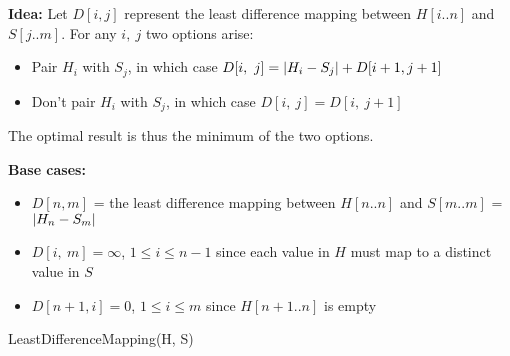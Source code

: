\documentclass[12pt]{article}
\newenvironment{question}[2][Question]{\begin{trivlist}
\item[\hskip \labelsep {\bfseries #1}\hskip \labelsep {\bfseries #2.}]}{\end{trivlist}}
\DeclarePairedDelimiter\abs{\lvert}{\rvert}%
\begin{document}
\begin{question}{2 (a)}
\end{question}

\begin{question}{2 (b)}
  \leavevmode \\ \\
  \textbf{Idea:} Let $D[i, j]$ represent the least difference mapping between
  $H[i..n]$ and $S[j..m]$.  For any $i,\ j$ two options arise:
  \begin{itemize}
    \item Pair $H_{i}$ with $S_{j}$, in which case $D[i,\ j] = \abs{H_{i} - S_{j}} + D[i + 1, j + 1]$
    \item Don't pair $H_{i}$ with $S_{j}$, in which case $D[i,\ j] = D[i,\ j + 1]$
  \end{itemize}
  The optimal result is thus the minimum of the two options.
  
  \pagebreak

  \textbf{Base cases:}
  \begin{itemize}
    \item $D[n, m]$ = the least difference mapping between $H[n..n]$ and $S[m..m]$ = $\abs{H_{n} - S_{m}}$
    \item $D[i,\ m] = \infty$, $1 \leq i \leq n - 1$ since each value in $H$ must map to a distinct value in $S$
    \item $D[n + 1, i] = 0$, $1 \leq i \leq m$ since $H[n+1..n]$ is empty
  \end{itemize}

  \begin{algorithm}[H]
    \caption{LeastDifferenceMapping(H, S)}
    \BlankLine

  \end{algorithm}


\end{question}
\end{document}
